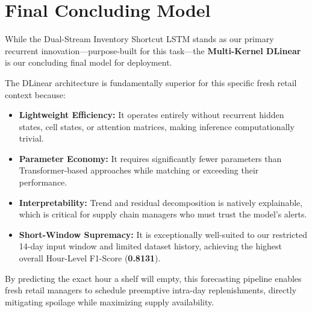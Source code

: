 \section{Final Concluding Model}

While the Dual-Stream Inventory Shortcut LSTM stands as our primary recurrent innovation—purpose-built for this task—the \textbf{Multi-Kernel DLinear} is our concluding final model for deployment. 

The DLinear architecture is fundamentally superior for this specific fresh retail context because:
\begin{itemize}
    \item \textbf{Lightweight Efficiency:} It operates entirely without recurrent hidden states, cell states, or attention matrices, making inference computationally trivial.
    \item \textbf{Parameter Economy:} It requires significantly fewer parameters than Transformer-based approaches while matching or exceeding their performance.
    \item \textbf{Interpretability:} Trend and residual decomposition is natively explainable, which is critical for supply chain managers who must trust the model's alerts.
    \item \textbf{Short-Window Supremacy:} It is exceptionally well-suited to our restricted 14-day input window and limited dataset history, achieving the highest overall Hour-Level F1-Score (\textbf{0.8131}).
\end{itemize}

By predicting the exact hour a shelf will empty, this forecasting pipeline enables fresh retail managers to schedule preemptive intra-day replenishments, directly mitigating spoilage while maximizing supply availability.
